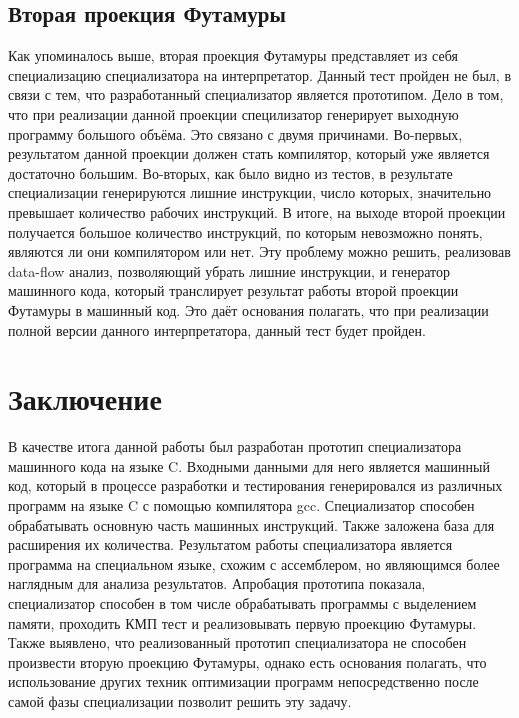 \subsection{Вторая проекция Футамуры}
Как упоминалось выше, вторая проекция Футамуры представляет из себя специализацию специализатора на интерпретатор. Данный тест пройден не был, в связи с тем, что разработанный специализатор является прототипом. Дело в том, что при реализации данной проекции специлизатор генерирует выходную программу большого объёма. Это связано с двумя причинами. Во-первых, результатом данной проекции должен стать компилятор, который уже является достаточно большим. Во-вторых, как было видно из тестов, в результате специализации генерируются лишние инструкции, число которых, значительно превышает количество рабочих инструкций. В итоге, на выходе второй проекции получается большое количество инструкций, по которым невозможно понять, являются ли они компилятором или нет. Эту проблему можно решить, реализовав data-flow анализ, позволяющий убрать лишние инструкции, и генератор машинного кода, который транслирует результат работы второй проекции Футамуры в машинный код. Это даёт основания полагать, что при реализации полной версии данного интерпретатора, данный тест будет пройден.


\section{Заключение}
В качестве итога данной работы был разработан прототип специализатора машинного кода на языке \textsf{C}. Входными данными для него является машинный код, который в процессе разработки и тестирования генерировался из различных программ на языке \textsf{C} с помощью компилятора gcc. Специализатор способен обрабатывать основную часть машинных инструкций. Также заложена база для расширения их количества. Результатом работы специализатора является программа на специальном языке, схожим с ассемблером, но являющимся более наглядным для анализа результатов. Апробация прототипа показала, специализатор способен в том числе обрабатывать программы с выделением памяти, проходить КМП тест и реализовывать первую проекцию Футамуры.
Также выявлено, что реализованный прототип специализатора не способен произвести вторую проекцию Футамуры,
однако есть основания полагать, что использование других техник оптимизации программ непосредственно после самой фазы специализации
позволит решить эту задачу.

